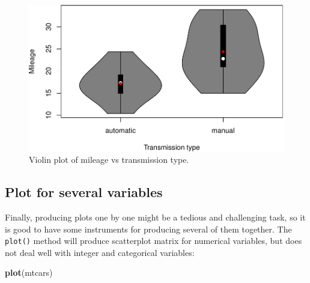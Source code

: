 \documentclass[
]{book}
\newenvironment{Shaded}{\begin{snugshade}}{\end{snugshade}}
\newcommand{\AttributeTok}[1]{\textcolor[rgb]{0.13,0.29,0.53}{#1}}
\newcommand{\DecValTok}[1]{\textcolor[rgb]{0.00,0.00,0.81}{#1}}
\newcommand{\FunctionTok}[1]{\textcolor[rgb]{0.13,0.29,0.53}{\textbf{#1}}}
\newcommand{\NormalTok}[1]{#1}
\newcommand{\SpecialCharTok}[1]{\textcolor[rgb]{0.81,0.36,0.00}{\textbf{#1}}}
\newcommand{\StringTok}[1]{\textcolor[rgb]{0.31,0.60,0.02}{#1}}
\theoremstyle{definition}
\theoremstyle{definition}
\theoremstyle{definition}
\theoremstyle{definition}
\theoremstyle{remark}
\begin{document}
\begin{Shaded}
\end{Shaded}

\begin{figure}
\centering
\includegraphics{Svetunkov---Statistics-for-Business-Analytics_files/figure-latex/vioAMMPG-1.pdf}
\caption{\label{fig:vioAMMPG}Violin plot of mileage vs transmission type.}
\end{figure}

\subsection{Plot for several variables}\label{plot-for-several-variables}

Finally, producing plots one by one might be a tedious and challenging task, so it is good to have some instruments for producing several of them together. The \texttt{plot()} method will produce scatterplot matrix for numerical variables, but does not deal well with integer and categorical variables:

\begin{Shaded}
\begin{Highlighting}[]
\FunctionTok{plot}\NormalTok{(mtcars)}
\end{Highlighting}
\end{Shaded}
\end{document}
